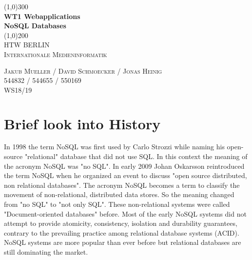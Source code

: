 \documentclass[11pt]{article}
\begin{document}
\begin{titlepage} 
	\begin{center}
	\line(1,0){300} \\
	[4mm]
	\huge{\bfseries WT1 Webapplications \\ NoSQL Databases} \\
	[2mm]
	\line(1,0){200}\\	
	[1.5cm]
	\textsc{\LARGE HTW BERLIN}\\
	[0.75cm]
	\textsc{\LARGE Internationale Medieninformatik} \\  
	[9cm]
	\end{center}	 
	\begin{flushright}
		\textsc{\large Jakub Mueller / David Schmoecker / Jonas Heinig \\
		544832 / 544655 / 550169 \\
		WS18/19\\}
	\end{flushright} 
	 
	
	
\end{titlepage}  
 

\tableofcontents
  
\cleardoublepage %




\setcounter{page}{1} %



\section{Brief look into History} 
In 1998 the term NoSQL was first used by Carlo Strozzi while naming his open-source "relational" database that did not use SQL. In this context the meaning of the acronym NoSQL was "no SQL".
In early 2009 Johan Oskarsson reintroduced the term NoSQL when he organized an event to discuss "open source distributed, non relational databases". The acronym NoSQL becomes a term to classify the movement of non-relational, distributed data stores. So the meaning changed from "no SQL" to "not only SQL".
These non-relational systems were called "Document-oriented databases" before. Most of the early NoSQL systems did not attempt to provide atomicity, consistency, isolation and durability guarantees,  contrary to the prevailing practice among relational database systems (ACID).
NoSQL systems are more popular than ever before but relational databases are still dominating the market.  
\end{document}
